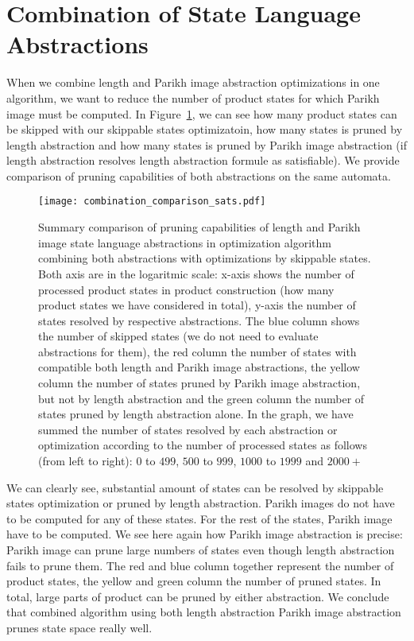 \section{Combination of State Language Abstractions}

When we combine length and Parikh image abstraction optimizations in one algorithm, we want to reduce the number of product states for which Parikh image must be computed. In Figure~\ref{fig:diagram:combined_sat_unsat_comparison}, we can see how many product states can be skipped with our skippable states optimizatoin, how many states is pruned by length abstraction and how many states is pruned by Parikh image abstraction (if length abstraction resolves length abstraction formule as satisfiable). We provide comparison of pruning capabilities of both abstractions on the same automata.

\begin{figure}[ht]
	\centering
	\texttt{[image: combination\_comparison\_sats.pdf]}
	\caption{Summary comparison of pruning capabilities of length and Parikh image state language abstractions in optimization algorithm combining both abstractions with optimizations by skippable states. Both axis are in the logaritmic scale: x-axis shows the number of processed product states in product construction (how many product states we have considered in total), y-axis the number of states resolved by respective abstractions. The blue column shows the number of skipped states (we do not need to evaluate abstractions for them), the red column the number of states with compatible both length and Parikh image abstractions, the yellow column the number of states pruned by Parikh image abstraction, but not by length abstraction and the green column the number of states pruned by length abstraction alone. In the graph, we have summed the number of states resolved by each abstraction or optimization according to the number of processed states as follows (from left to right): $0$ to $499$, $500$ to $999$, $1000$ to $1999$ and $2000+$ }
	\label{fig:diagram:combined_sat_unsat_comparison}
\end{figure}

We can clearly see, substantial amount of states can be resolved by skippable states optimization or pruned by length abstraction. Parikh images do not have to be computed for any of these states. For the rest of the states, Parikh image have to be computed. We see here again how Parikh image abstraction is precise: Parikh image can prune large numbers of states even though length abstraction fails to prune them. The red and blue column together represent the number of product states, the yellow and green column the number of pruned states. In total, large parts of product can be pruned by either abstraction. We conclude that combined algorithm using both length abstraction Parikh image abstraction prunes state space really well.



